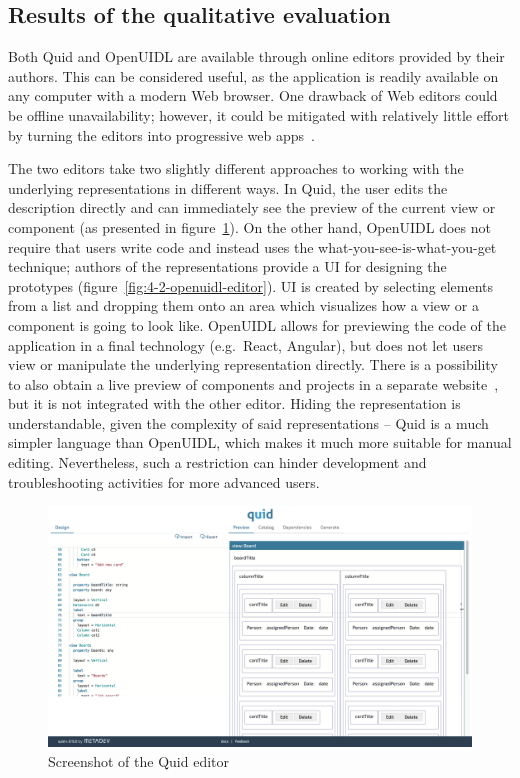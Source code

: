 \subsection{Results of the qualitative evaluation}\label{subsec:results-of-the-qualitative-evaluation}
Both Quid and OpenUIDL are available through online editors provided by their authors.
This can be considered useful, as the application is readily available on any computer with a modern Web browser.
One drawback of Web editors could be offline unavailability;
however, it could be mitigated with relatively little effort by turning the editors into progressive web apps~.

The two editors take two slightly different approaches to working with the underlying representations in different ways.
In Quid, the user edits the description directly and can immediately see the preview of the current view or component (as presented in figure~\ref{fig:4-2-quid-editor}).
On the other hand, OpenUIDL does not require that users write code and instead uses the what-you-see-is-what-you-get technique; authors of the representations provide a UI for designing the prototypes (figure~\ref{fig:4-2-openuidl-editor}).
UI is created by selecting elements from a list and dropping them onto an area which visualizes how a view or a component is going to look like.
OpenUIDL allows for previewing the code of the application in a final technology (e.g.\ React, Angular), but does not let users view or manipulate the underlying representation directly.
There is a possibility to also obtain a live preview of components and projects in a separate website~, but it is not integrated with the other editor.
Hiding the representation is understandable, given the complexity of said representations -- Quid is a much simpler language than OpenUIDL, which makes it much more suitable for manual editing.
Nevertheless, such a restriction can hinder development and troubleshooting activities for more advanced users.

\begin{figure}
    \centering
    \includegraphics[width=\textwidth]{4-results-and-discussion/quid-editor}
    \caption{Screenshot of the Quid editor}
    \label{fig:4-2-quid-editor}
\end{figure}

